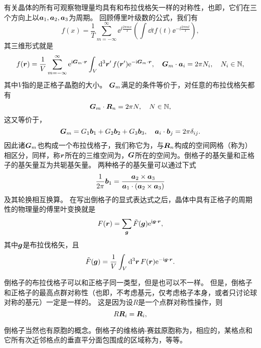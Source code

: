 有关晶体的所有可观察物理量均具有和布拉伐格矢一样的对称性，也即，它们在三个方向上以$\vb*{a}_1,\vb*{a}_2,\vb*{a}_3$为周期。
回顾傅里叶级数的公式，我们有
\[
    f(x) = \frac{1}{T} \sum_{m=-\infty}^\infty \ee^{\ii \frac{2\pi m x}{T}} \left(\int \dd{t} f(t) \ee^{-\ii \frac{2\pi m t}{T}}\right) ,
\]
其三维形式就是
\[
    f(\vb*{r}) = \frac{1}{V} \sum_{m=-\infty}^\infty \mathrm{e}^{\mathrm{i} \vb*{G}_m \cdot \vb*{r}} \int_V \dd[3]{\vb*{r}'} f(\vb*{r}') \mathrm{e}^{- \mathrm{i} \vb*{G}_m \cdot \vb*{r}}, \quad \vb*{G}_m \cdot \vb*{a}_i = 2\pi N_i, \quad N_i \in \mathbb{N},
\]
其中$V$指的是正格子晶胞的大小。
$\vb*{G}_m$满足的条件等价于，对任意的布拉伐格矢都有
\begin{equation}
    \vb*{G}_m \cdot \vb*{R}_n = 2\pi N, \quad N \in \mathbb{N},
\end{equation}
这又等价于，
\begin{equation}
    \vb*{G}_m = G_1 \vb*{b}_1 + G_2 \vb*{b}_2 + G_3 \vb*{b}_3, \quad \vb*{a}_i \cdot \vb*{b}_j = 2 \pi \delta_{ij}.
\end{equation}
因此诸$\vb*{G}_m$也构成一个布拉伐格子，我们称它为，与$\vb*{R}_n$构成的空间网格（称为）相区分，同样，称$\vb*{r}$所在的三维空间为，$\vb*{G}$所在的空间为。倒格子的基矢量和正格子的基矢量互为共轭基矢量。
两种格子的基矢量可以通过下式
\begin{equation}
    \frac{1}{2\pi} \vb*{b}_1 = \frac{\vb*{a}_2 \times \vb*{a}_3}{\vb*{a}_1 \cdot (\vb*{a}_2 \times \vb*{a}_3)}
\end{equation}
及其轮换相互换算。
在写出倒格子的显式表达式之后，晶体中具有正格子的周期性的物理量的傅里叶变换就是
\begin{equation}
    F(\vb*{r}) = \sum_{\vb*{g}} \tilde{F}(\vb*{g}) \mathrm{e}^{\mathrm{i} \vb*{g} \cdot \vb*{r}},
\end{equation}
其中$\vb*{g}$是布拉伐格矢，且
\begin{equation}
    \tilde{F}(\vb*{g}) = \frac{1}{V} \int_V \dd[3]{\vb*{r}} F(\vb*{r}) \mathrm{e}^{-\mathrm{i} \vb*{g} \cdot \vb*{r}}.
\end{equation}

倒格子的布拉伐格子可以和正格子同一类型，但是也可以不一样。
但是，倒格子和正格子的最高点群对称性（也即，不考虑基元，仅考虑格子本身，或者只讨论球对称的基元）一定是一样的。
这是因为设$R$是一个点群对称性操作，则
\[
    R \vb*{R}_i = \vb*{R}_i,
\]

倒格子当然也有原胞的概念。倒格子的维格纳-赛兹原胞称为，相应的，某格点和它所有次近邻格点的垂直平分面包围成的区域称为，等等。

